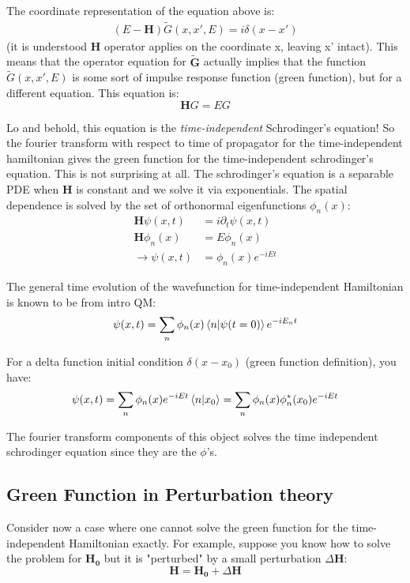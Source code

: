 \documentclass[11pt]{article}
\theoremstyle{definition}
\begin{document}
The coordinate representation of the equation above is:
\begin{align}
(E - \mathbf{H}) \tilde{G}(x, x', E) = i \delta(x - x')
\end{align}
(it is understood $\mathbf{H}$ operator applies on the coordinate x, leaving x' intact).  This means that the operator equation for $\mathbf{\tilde{G}}$ actually implies that the function $\tilde{G}(x, x', E)$ is some sort of impulse response function (green function), but for a different equation.  This equation is:
$$\mathbf{H} G = E G$$

Lo and behold, this equation is the \emph{time-independent} Schrodinger's equation!  So the fourier transform with respect to time of propagator for the time-independent hamiltonian gives the green function for the time-independent schrodinger's equation.
This is not surprising at all.  The schrodinger's equation is a separable PDE when $\mathbf{H}$ is constant and we solve it via exponentials.  The spatial dependence is solved by the set of orthonormal eigenfunctions $\phi_n(x)$: 
\begin{align}
\mathbf{H} \psi(x, t) &= i \partial_t \psi(x, t) \\
\mathbf{H} \phi_n(x) & = E \phi_n(x) \\
\rightarrow \psi(x, t) &= \phi_n(x) e^{-i E t} 
\end{align}

The general time evolution of the wavefunction for time-independent Hamiltonian is known to be from intro QM:
\begin{align}
\psi(x, t) = \sum_n \phi_n(x) \braket{n|\psi(t=0)} e^{-i E_n t} \\
\end{align}

For a delta function initial condition $\delta(x-x_0)$ (green function definition), you have:
\begin{align}
\psi(x, t) = \sum_n \phi_n(x) e^{- i Et} \braket{n|x_0} = \sum_n \phi_n(x) \phi_n^*(x_0) e^{-i Et}
\end{align}

The fourier transform components of this object solves the time independent schrodinger equation since they are the $\phi$'s.

\subsection{Green Function in Perturbation theory}
Consider now a case where one cannot solve the green function for the time-independent Hamiltonian exactly.  For example, suppose you know how to solve the problem for $\mathbf{H_0}$ but it is "perturbed" by a small perturbation $\Delta \mathbf{H}$:
 $$\mathbf{H} = \mathbf{H_0} + \Delta \mathbf{H}$$
\end{document}
